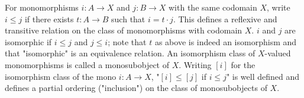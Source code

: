 For monomorphisms $i: A \rightarrow X$ and $j: B \rightarrow X$ with the same codomain $X$, write $i \leqslant j$ if there exists $t: A \longrightarrow B$ such that $i = t \cdot j$. This defines a reflexive and transitive relation on the class of monomorphisms with codomain $X$. $i$ and $j$ are isomorphic if $i \leqslant j$ and $j \leqslant i$; note that $t$ as above is indeed an isomorphism and that "isomorphic" is an equivalence relation. An isomorphism class of $X$-valued monomorphisms is called a monosubobject of $X$. Writing $[i]$ for the isomorphism class of the mono $i: A \rightarrow X$, "$[i] \leqslant [j]$ if $i \leqslant j$" is well defined and defines a partial ordering ("inclusion") on the class of monosubobjects of $X$.
